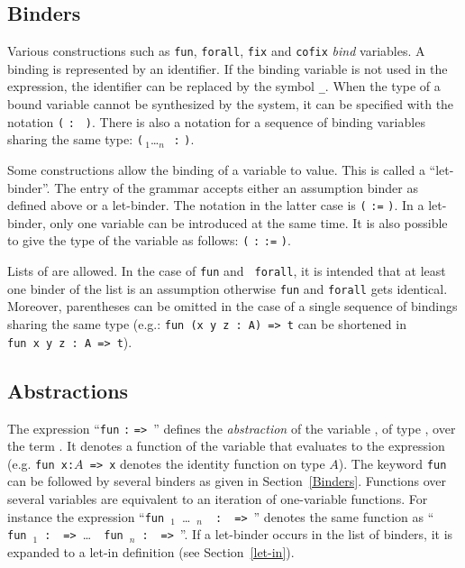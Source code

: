 \subsection{Binders
\label{Binders}
}

Various constructions such as {\tt fun}, {\tt forall}, {\tt fix} and
{\tt cofix} {\em bind} variables. A binding is represented by an
identifier. If the binding variable is not used in the expression, the
identifier can be replaced by the symbol {\tt \_}.  When the type of a
bound variable cannot be synthesized by the system, it can be
specified with the notation {\tt (}\,{\ident}\,{\tt :}\,{\type}\,{\tt
)}. There is also a notation for a sequence of binding variables
sharing the same type: {\tt (}\,{\ident$_1$}\ldots{\ident$_n$}\,{\tt
:}\,{\type}\,{\tt )}.

Some constructions allow the binding of a variable to value. This is
called a ``let-binder''. The entry {\binder} of the grammar accepts
either an assumption binder as defined above or a let-binder. 
The notation in the
latter case is {\tt (}\,{\ident}\,{\tt :=}\,{\term}\,{\tt )}. In a
let-binder, only one variable can be introduced at the same
time. It is also possible to give the type of the variable as follows:
{\tt (}\,{\ident}\,{\tt :}\,{\term}\,{\tt :=}\,{\term}\,{\tt )}.

Lists of {\binder} are allowed. In the case of {\tt fun} and {\tt
  forall}, it is intended that at least one binder of the list is an
assumption otherwise {\tt fun} and {\tt forall} gets identical. Moreover,
parentheses can be omitted in the case of a single sequence of
bindings sharing the same type (e.g.: {\tt fun~(x~y~z~:~A)~=>~t} can
be shortened in {\tt fun~x~y~z~:~A~=>~t}).

\subsection{Abstractions
\label{abstractions}
}

The expression ``{\tt fun} {\ident} {\tt :} {\type} {\tt =>}~{\term}''
defines the {\em abstraction} of the variable {\ident}, of type
{\type}, over the term {\term}. It denotes a function of the variable
{\ident} that evaluates to the expression {\term} (e.g. {\tt fun x:$A$
=> x} denotes the identity function on type $A$).
The keyword {\tt fun} can be followed by several binders as given in
Section~\ref{Binders}. Functions over several variables are
equivalent to an iteration of one-variable functions.  For instance the
expression ``{\tt fun}~{\ident$_{1}$}~{\ldots}~{\ident$_{n}$}~{\tt
:}~\type~{\tt =>}~{\term}'' denotes the same function as ``{\tt
fun}~{\ident$_{1}$}~{\tt :}~\type~{\tt =>}~{\ldots}~{\tt
fun}~{\ident$_{n}$}~{\tt :}~\type~{\tt =>}~{\term}''. If a let-binder
occurs in the list of binders, it is expanded to a let-in definition
(see Section~\ref{let-in}).

